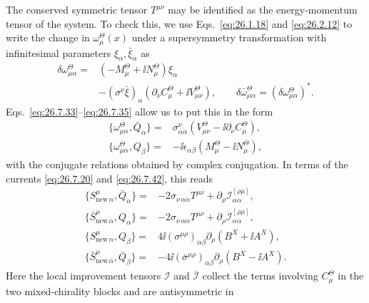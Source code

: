 The conserved symmetric tensor \(T^{\mu\nu}\) may be identified as the
energy-momentum tensor of the system. To check this, we use
Eqs.~\eqref{eq:26.1.18} and \eqref{eq:26.2.12} to write the change in
\(\omega_\mu^\Theta(x)\) under a supersymmetry transformation with
infinitesimal parameters \(\xi_\alpha,\bar\xi_{\dot\alpha}\) as
\[
  \begin{aligned}
  \delta\omega_{\mu\alpha}^\Theta
  ={}&(-M_\mu^\Theta+\ii N_\mu^\Theta)\xi_\alpha\\
   &-(\sigma^\nu\bar\xi)_\alpha
     (\partial_\nu C_\mu^\Theta+\ii V_{\mu\nu}^\Theta),
  \qquad
  \delta\bar\omega_{\mu\dot\alpha}^\Theta
  =(\delta\omega_{\mu\alpha}^\Theta)^* .
  \end{aligned}
\]
Eqs.~\eqref{eq:26.7.33}--\eqref{eq:26.7.35} allow us to put this in the
form
\[
  \begin{aligned}
  \{\omega_{\mu\alpha}^\Theta,\bar Q_{\dot\alpha}\}
  ={}&\sigma^\nu_{\alpha\dot\alpha}
      (V_{\mu\nu}^\Theta-\ii\partial_\nu C_\mu^\Theta),\\
  \{\omega_{\mu\alpha}^\Theta,Q_\beta\}
  ={}&-\ii\epsilon_{\alpha\beta}
      (M_\mu^\Theta-\ii N_\mu^\Theta),
  \end{aligned}
\]
with the conjugate relations obtained by complex conjugation.
In terms of the currents \eqref{eq:26.7.20} and \eqref{eq:26.7.42}, this
reads
\begin{equation}
  \begin{aligned}
  \{S_{\mathrm{new}\,\alpha}^\mu,\bar Q_{\dot\alpha}\}
  ={}&-2\sigma_{\nu\,\alpha\dot\alpha}T^{\mu\nu}
      +\partial_\rho
       \mathcal I^{[\rho\mu]}_{\alpha\dot\alpha},\\
  \{\bar S_{\mathrm{new}\,\dot\alpha}^\mu,Q_\alpha\}
  ={}&-2\sigma_{\nu\,\alpha\dot\alpha}T^{\mu\nu}
      +\partial_\rho
       \overline{\mathcal I}^{[\rho\mu]}_{\alpha\dot\alpha},
  \\
  \{S_{\mathrm{new}\,\alpha}^\mu,Q_\beta\}
  ={}&4\ii(\sigma^{\mu\rho})_{\alpha\beta}
       \partial_\rho(B^X+\ii A^X),
  \\
  \{\bar S_{\mathrm{new}\,\dot\alpha}^\mu,\bar Q_{\dot\beta}\}
  ={}&-4\ii(\bar\sigma^{\mu\rho})_{\dot\alpha\dot\beta}
       \partial_\rho(B^X-\ii A^X).
  \end{aligned}
  \tag{26.7.45}\label{eq:26.7.45}
\end{equation}
Here the local improvement tensors \(\mathcal I\) and
\(\overline{\mathcal I}\) collect the terms involving
\(C_\mu^\Theta\) in the two mixed-chirality blocks and are antisymmetric in
